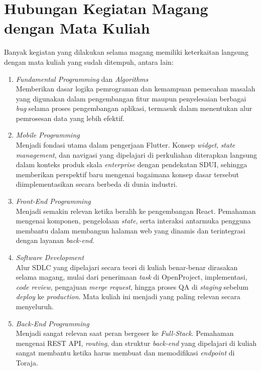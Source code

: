 \section{Hubungan Kegiatan Magang dengan Mata Kuliah}

Banyak kegiatan yang dilakukan selama magang memiliki keterkaitan langsung
dengan mata kuliah yang sudah ditempuh, antara lain:

\begin{enumerate}
      \item \textit{Fundamental Programming} dan \textit{Algorithms}\\
            Memberikan dasar logika pemrograman dan kemampuan pemecahan masalah
            yang digunakan dalam pengembangan fitur maupun penyelesaian berbagai
            \textit{bug} selama proses pengembangan aplikasi, termasuk dalam
            menentukan alur pemrosesan data yang lebih efektif.

      \item \textit{Mobile Programming}\\ Menjadi fondasi utama dalam pengerjaan Flutter. Konsep
            \textit{widget}, \textit{state management}, dan navigasi yang dipelajari di perkuliahan
            diterapkan langsung dalam konteks produk skala \textit{enterprise} dengan pendekatan
            SDUI, sehingga memberikan perspektif baru mengenai bagaimana konsep dasar
            tersebut diimplementasikan secara berbeda di dunia industri.

      \item \textit{Front-End Programming}\\ Menjadi semakin relevan ketika beralih ke pengembangan
            React. Pemahaman mengenai komponen, pengelolaan \textit{state}, serta interaksi
            antarmuka pengguna membantu dalam membangun halaman web yang dinamis
            dan terintegrasi dengan layanan \textit{back-end}.

      \item \textit{Software Development}\\ Alur SDLC yang dipelajari secara teori di kuliah
            benar-benar dirasakan selama magang, mulai dari penerimaan \textit{task} di OpenProject,
            implementasi, \textit{code review}, pengajuan \textit{merge request}, hingga proses QA di \textit{staging}
            sebelum \textit{deploy} ke \textit{production}. Mata kuliah ini menjadi yang paling relevan
            secara menyeluruh.

      \item \textit{Back-End Programming}\\ Menjadi sangat relevan saat peran bergeser ke
            \textit{Full-Stack}. Pemahaman mengenai REST API, \textit{routing}, dan struktur \textit{back-end} yang
            dipelajari di kuliah sangat membantu ketika harus membuat dan memodifikasi
            \textit{endpoint} di Toraja.


\end{enumerate}
